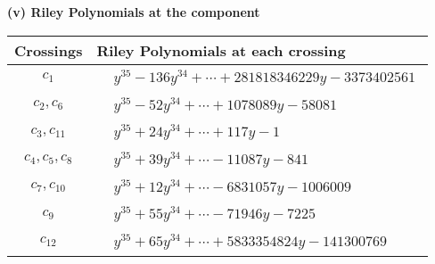 \documentclass[1p]{elsarticle_modified}
\theoremstyle{definition}
\begin{document}
\flushleft \textbf{(v) Riley Polynomials at the component}\newline \\
\begin{tabular}{m{50pt}|m{274pt}}
Crossings & \hspace{64pt}Riley Polynomials at each crossing \\
\hline $$\begin{aligned}c_{1}\end{aligned}$$&$\begin{aligned}
&y^{35}-136 y^{34}+\cdots+281818346229 y-3373402561
\end{aligned}$\\
\hline $$\begin{aligned}c_{2},c_{6}\end{aligned}$$&$\begin{aligned}
&y^{35}-52 y^{34}+\cdots+1078089 y-58081
\end{aligned}$\\
\hline $$\begin{aligned}c_{3},c_{11}\end{aligned}$$&$\begin{aligned}
&y^{35}+24 y^{34}+\cdots+117 y-1
\end{aligned}$\\
\hline $$\begin{aligned}c_{4},c_{5},c_{8}\end{aligned}$$&$\begin{aligned}
&y^{35}+39 y^{34}+\cdots-11087 y-841
\end{aligned}$\\
\hline $$\begin{aligned}c_{7},c_{10}\end{aligned}$$&$\begin{aligned}
&y^{35}+12 y^{34}+\cdots-6831057 y-1006009
\end{aligned}$\\
\hline $$\begin{aligned}c_{9}\end{aligned}$$&$\begin{aligned}
&y^{35}+55 y^{34}+\cdots-71946 y-7225
\end{aligned}$\\
\hline $$\begin{aligned}c_{12}\end{aligned}$$&$\begin{aligned}
&y^{35}+65 y^{34}+\cdots+5833354824 y-141300769
\end{aligned}$\\
\hline
\end{tabular}\\~\\
\end{document}
